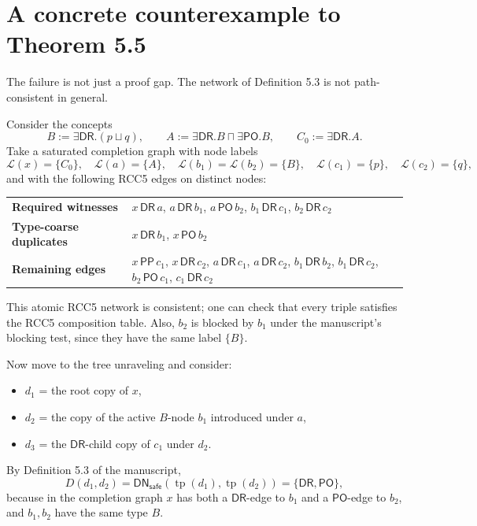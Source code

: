\documentclass[11pt]{article}
\newcommand{\DR}{\mathsf{DR}}
\newcommand{\PO}{\mathsf{PO}}
\newcommand{\PP}{\mathsf{PP}}
\newcommand{\Llab}{\mathcal{L}}
\newcommand{\DNsafe}{\mathsf{DN}_{\mathsf{safe}}}
\begin{document}
\section{A concrete counterexample to Theorem 5.5}

The failure is not just a proof gap. The network of Definition 5.3 is not path-consistent in general.

Consider the concepts
\[
B := \exists \DR.(p \sqcup q),
\qquad
A := \exists \DR.B \sqcap \exists \PO.B,
\qquad
C_0 := \exists \DR.A.
\]
Take a saturated completion graph with node labels
\[
\Llab(x)=\{C_0\}, \quad \Llab(a)=\{A\}, \quad \Llab(b_1)=\Llab(b_2)=\{B\},
\quad \Llab(c_1)=\{p\}, \quad \Llab(c_2)=\{q\},
\]
and with the following RCC5 edges on distinct nodes:

\begin{center}
\begin{tabularx}{0.96\linewidth}{@{}>{\bfseries}lYY@{}}
\toprule
Required witnesses & $x\,\DR\,a$, $a\,\DR\,b_1$, $a\,\PO\,b_2$, $b_1\,\DR\,c_1$, $b_2\,\DR\,c_2$ \\
Type-coarse duplicates & $x\,\DR\,b_1$, $x\,\PO\,b_2$ \\
Remaining edges & $x\,\PP\,c_1$, $x\,\DR\,c_2$, $a\,\DR\,c_1$, $a\,\DR\,c_2$, $b_1\,\DR\,b_2$, $b_1\,\DR\,c_2$, $b_2\,\PO\,c_1$, $c_1\,\DR\,c_2$ \\
\bottomrule
\end{tabularx}
\end{center}

This atomic RCC5 network is consistent; one can check that every triple satisfies the RCC5 composition table. Also, $b_2$ is blocked by $b_1$ under the manuscript's blocking test, since they have the same label $\{B\}$.

Now move to the tree unraveling and consider:
\begin{itemize}[leftmargin=1.5em]
  \item $d_1$ = the root copy of $x$,
  \item $d_2$ = the copy of the active $B$-node $b_1$ introduced under $a$,
  \item $d_3$ = the $\DR$-child copy of $c_1$ under $d_2$.
\end{itemize}

By Definition 5.3 of the manuscript,
\[
D(d_1,d_2)=\DNsafe(\operatorname{tp}(d_1),\operatorname{tp}(d_2))=\{\DR,\PO\},
\]
because in the completion graph $x$ has both a $\DR$-edge to $b_1$ and a $\PO$-edge to $b_2$, and $b_1,b_2$ have the same type $B$.
\end{document}
